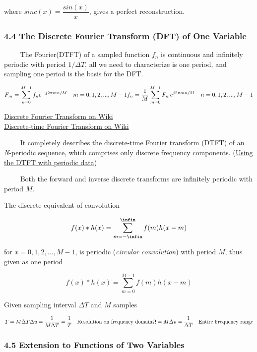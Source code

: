 \documentclass[]{article}
\begin{document}
where \(sinc(x)=\dfrac{sin(x)}{x}\), gives a perfect reconstruction.

\subsubsection{4.4 The Discrete Fourier Transform (DFT) of One
Variable}\label{header-n417}

\(\quad\quad\) The Fourier(DTFT) of a sampled function \(f_n\) is
continuous and infinitely periodic with period \(1/\Delta T\), all we
need to characterize is one period, and sampling one period is the basis
for the DFT.

\[F_m=\sum\limits^{M-1}_{n=0}f_ne^{-j2\pi mn/M}\quad m=0,1,2,...,M-1
\\f_n=\dfrac{1}{M}\sum\limits^{M-1}_{m=0}F_m e^{j2\pi mn/M}\quad n=0,1,2,...,M-1\]

\href{https://en.wikipedia.org/wiki/Discrete_Fourier_transform}{Discrete
Fourier Transform on Wiki}\\

\href{https://en.wikipedia.org/wiki/Discrete-time_Fourier_transform}{Discrete-time
Fourier Transform on Wiki}

\(\quad\quad\) It completely describes the
\href{https://en.wikipedia.org/wiki/Discrete-time_Fourier_transform}{discrete-time
Fourier transform} (DTFT) of an \emph{N}-periodic sequence, which
comprises only discrete frequency components.
(\href{https://en.wikipedia.org/wiki/Discrete-time_Fourier_transform\#Periodic_data}{Using
the DTFT with periodic data})

\(\quad\quad\) Both the forward and inverse discrete transforms are
infinitely periodic with period \(M\).

The discrete equivalent of convolution

\[f(x)*h(x)=\sum\limits^{\infin}_{m=-\infin}f(m)h(x-m)\]

for \(x=0,1,2,...,M-1\), is periodic (\emph{circular convolution}) with
period \(M\), thus given as one period

\[f(x)*h(x)=\sum\limits^{M-1}_{m=0}f(m)h(x-m)\]

Given sampling interval \(\Delta T\) and \(M\) samples

\[T=M\Delta T\\
\Delta u = \dfrac{1}{M\Delta T}=\dfrac{1}{T}\quad \text{Resolution on frequency domain}\\
\Omega=M\Delta u=\dfrac{1}{\Delta T}\quad \text{Entire Frequency range}\]

\subsubsection{4.5 Extension to Functions of Two
Variables}\label{header-n437}
\end{document}
